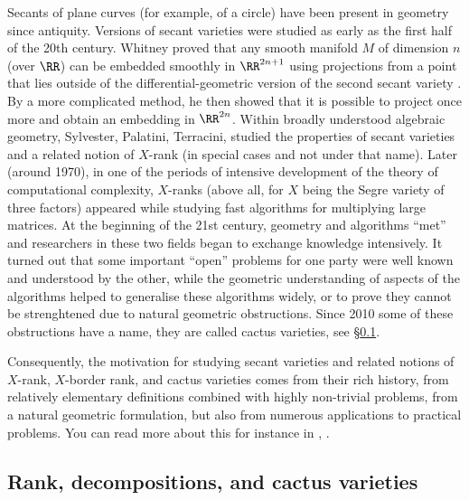 \documentclass[12pt,a4paper]{article}
\begin{document}
Secants of plane curves (for example, of a circle) have been present in geometry since antiquity.
Versions of secant varieties were studied as early as the first half of the 20th century.
Whitney proved that any smooth  manifold $M$ of dimension $n$ (over $\RR$) can be embedded smoothly in $\RR^{2n+1}$ using projections from a point that lies outside of the differential-geometric version of the second secant variety \cite[\S3]{persson_Whitney_embedding_thm}.
By a more complicated method, he then showed that it is possible to project once more and obtain an embedding in $\RR^{2n}$.
Within broadly understood algebraic geometry, Sylvester, Palatini, Terracini, studied the properties of secant varieties and a related notion of $X$-rank (in special cases and not under that name). Later (around 1970), in one of the periods of intensive development of the theory of computational complexity, $X$-ranks (above all, for $X$ being the Segre variety of three factors) appeared while studying fast algorithms for multiplying large matrices. At the beginning of the 21st century, geometry and algorithms ``met'' and researchers in these two fields began to exchange knowledge intensively. It turned out that some important ``open'' problems for one party were well known and understood by the other, while the geometric understanding of aspects of the algorithms helped to generalise these algorithms widely,
or to prove they cannot be strenghtened due to natural geometric obstructions.
Since 2010 some of these obstructions have a name, they are called cactus varieties, see \S\ref{sec_intro_cacti}.

Consequently, the motivation for studying secant varieties and related notions of $X$-rank, $X$-border rank, and cactus varieties comes from their rich history, from
relatively elementary definitions combined with highly non-trivial problems,
from a natural geometric formulation,
but also from numerous applications to practical problems.
You can read more about this for instance in
\cite[Chapt.~1]{landsberg_tensorbook},
\cite[Chapt.~1]{landsberg_geometry_and_complexity}.


\subsection{Rank, decompositions, and cactus varieties}\label{sec_intro_cacti}
\end{document}
